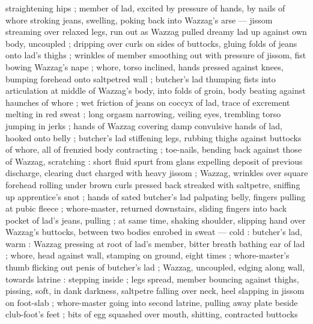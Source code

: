 straightening hips ; member of lad, excited by pressure of hands, by nails of whore stroking jeans, swelling, poking back into Wazzag's arse --- jissom streaming over relaxed legs, run out as Wazzag pulled dreamy lad up against own body, uncoupled ; dripping over curls on sides of buttocks, gluing folds of jeans onto lad's thighs ; wrinkles of member smoothing out with pressure of jissom, fist bowing Wazzag's nape ; whore, torso inclined, hands pressed against knees, bumping forehead onto saltpetred wall ; butcher's lad thumping fists into articulation at middle of Wazzag's body, into folds of groin, body beating against haunches of whore ; wet friction of jeans on coccyx of lad, trace of excrement melting in red sweat ; long orgasm narrowing, veiling eyes, trembling torso jumping in jerks ; hands of Wazzag covering damp convulsive hands of lad, hooked onto belly ; butcher's lad stiffening legs, rubbing thighs against buttocks of whore, all of frenzied body contracting ; toe-nails, bending back against those of Wazzag, scratching : short fluid spurt from glans expelling deposit of previous discharge, clearing duct charged with heavy jissom ; Wazzag, wrinkles over square forehead rolling under brown curls pressed back streaked with saltpetre, sniffing up apprentice's snot ; hands of sated butcher's lad palpating belly, fingers pulling at pubic fleece ; whore-master, returned downstairs, sliding fingers into back pocket of lad's jeans, pulling ; at same time, shaking shoulder, slipping hand over Wazzag's buttocks, between two bodies enrobed in sweat --- cold : butcher's lad, warm : Wazzag {\dashcom} pressing at root of lad's member, bitter breath bathing ear of lad  ; whore, head against wall, stamping on ground, eight times  ; whore-master's thumb flicking out penis of butcher's lad ; Wazzag, uncoupled, edging along wall, towards latrine : stepping inside ; legs spread, member bouncing against thighs, pissing, soft, in dank darkness, saltpetre falling over neck, heel slapping in jissom on foot-slab ; whore-master going into second latrine, pulling away plate beside club-foot's feet ; bits of egg squashed over mouth, shitting, contracted buttocks 
